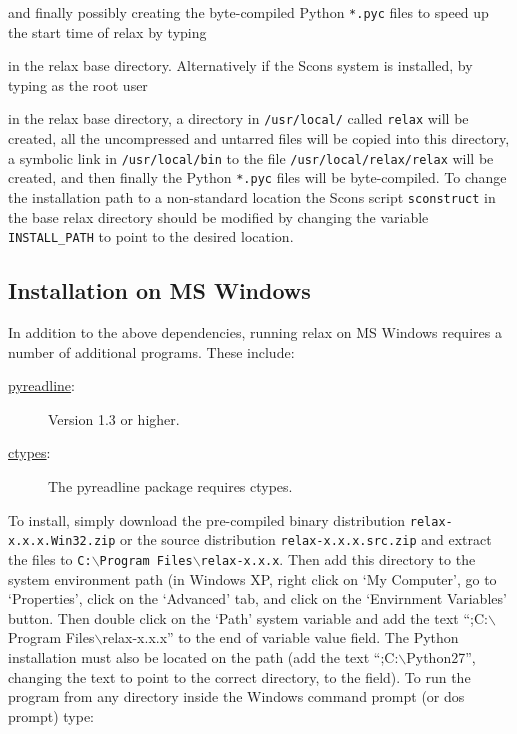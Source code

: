 
and finally possibly creating the byte-compiled Python \texttt{*.pyc} files to speed up the start time of relax by typing


in the relax base directory.  Alternatively if the Scons system is installed, by typing as the root user


in the relax base directory, a directory in \texttt{/usr/local/} called \texttt{relax} will be created, all the uncompressed and untarred files will be copied into this directory, a symbolic link in \texttt{/usr/local/bin} to the file \texttt{/usr/local/relax/relax} will be created, and then finally the Python \texttt{*.pyc} files will be byte-compiled.  To change the installation path to a non-standard location the Scons script \texttt{sconstruct} in the base relax directory should be modified by changing the variable \texttt{INSTALL\_PATH} to point to the desired location.



\subsection{Installation on MS Windows}

In addition to the above dependencies, running relax on MS Windows requires a number of additional programs.  These include:

\begin{description}
\item[\href{http://projects.scipy.org/ipython/ipython/wiki/PyReadline/Intro}{pyreadline}:]  Version 1.3 or higher.
\item[\href{http://starship.python.net/crew/theller/ctypes/}{ctypes}:]  The pyreadline package requires ctypes.
\end{description}

To install, simply download the pre-compiled binary distribution \texttt{relax-x.x.x.Win32.zip} or the source distribution \texttt{relax-x.x.x.src.zip} and extract the files to \texttt{C:$\backslash$Program Files$\backslash$relax-x.x.x}.  Then add this directory to the system environment path (in Windows XP, right click on `My Computer', go to `Properties', click on the `Advanced' tab, and click on the `Envirnment Variables' button.  Then double click on the `Path' system variable and add the text ``;C:$\backslash$Program Files$\backslash$relax-x.x.x'' to the end of variable value field.  The Python installation must also be located on the path (add the text ``;C:$\backslash$Python27'', changing the text to point to the correct directory, to the field).  To run the program from any directory inside the Windows command prompt (or dos prompt) type:

